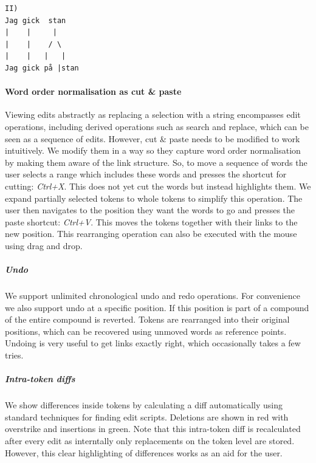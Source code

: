 \documentclass[10pt, a4paper]{article}
\newcommand{\dan}[1]{{\color{Fuchsia}{Dan: #1}}}
\begin{document}
\begin{verbatim}
II)
Jag gick  stan
|    |     |
|    |    / \
|    |   |   |
Jag gick på |stan
\end{verbatim}


\paragraph{Word order normalisation as cut \& paste}
Viewing edits abstractly as replacing a selection with a string encompasses
edit operations, including derived operations such as search and replace,
which can be seen as a sequence of edits. However, cut \& paste needs to
be modified to work intuitively. We modify them in a way so they capture
word order normalisation by making them aware of the link structure.
So, to move a sequence of words the user selects a range
which includes these words and presses the shortcut for cutting: {\it Ctrl+X}.
This does not yet cut the words but instead highlights them. We expand partially
selected tokens to whole tokens to simplify this operation. The user then
navigates to the position they want the words to go and presses the paste
shortcut: {\it Ctrl+V}.
This moves the tokens together with their links to the new position.
This rearranging operation can also be executed with the mouse using drag and drop.
\dan{Intend to add image with example showing this step by step}

\subparagraph{Undo} We support unlimited chronological undo and redo operations.
For convenience we also support undo at a specific position. %
If this position is part of a compound of the entire compound is reverted. %
Tokens are rearranged into their original positions, which
can be recovered using unmoved words as reference points.
Undoing is very useful to get links exactly right, which occasionally takes a
few tries.

\subparagraph{Intra-token diffs} We show differences inside tokens by
calculating a diff automatically using standard techniques for finding
edit scripts.  Deletions are shown in red with overstrike and insertions
in green.  Note that this intra-token diff is recalculated after every edit
as interntally only replacements on the token level are stored.  However,
this clear highlighting of differences works as an aid for the user.
\end{document}
